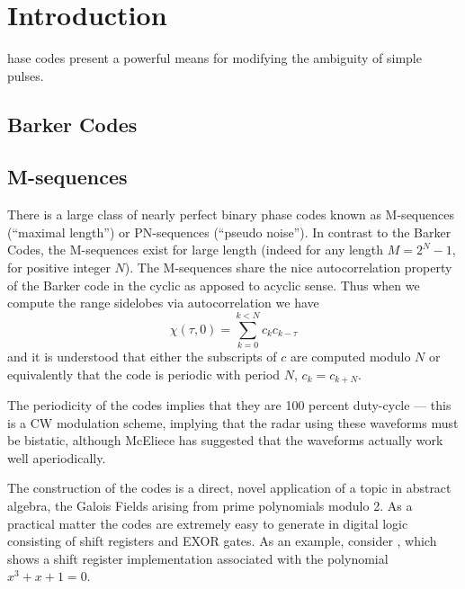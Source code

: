 \chapter{Introduction}

hase codes present a powerful means for modifying
the ambiguity of simple pulses.  

\section{Barker Codes}

\newpage

\section{M-sequences}

There is a large class of nearly perfect binary phase codes known as
M-sequences (``maximal length'') or PN-sequences (``pseudo noise'').
In contrast to the Barker Codes, the M-sequences exist for large
length (indeed for any length $M = 2^N - 1$, for positive integer
$N$).   The M-sequences share the nice autocorrelation property of the
Barker code in the cyclic as apposed to acyclic sense.  Thus when we
compute the range sidelobes via autocorrelation we have
\begin{equation}
\chi(\tau,0) = \sum_{k=0}^{k < N} c_k c_{k-\tau}
\end{equation}
and it is understood that either the subscripts of $c$ are computed
modulo $N$ or equivalently that the code is periodic with period $N$,
$c_k = c_{k+N}$.

The periodicity of the codes implies that they are 100 percent
duty-cycle --- this is a CW modulation scheme, implying that the radar
using these waveforms must be bistatic, although McEliece has
suggested that the waveforms actually work well aperiodically.

The construction of the codes is a direct, novel application of a
topic in abstract algebra, the Galois Fields arising from prime
polynomials modulo 2.  As a practical matter the codes are extremely
easy to generate in digital logic consisting of shift registers and
EXOR gates.  As an example, consider , which shows a
shift register implementation associated with the polynomial $x^3 + x
+ 1 = 0$.

